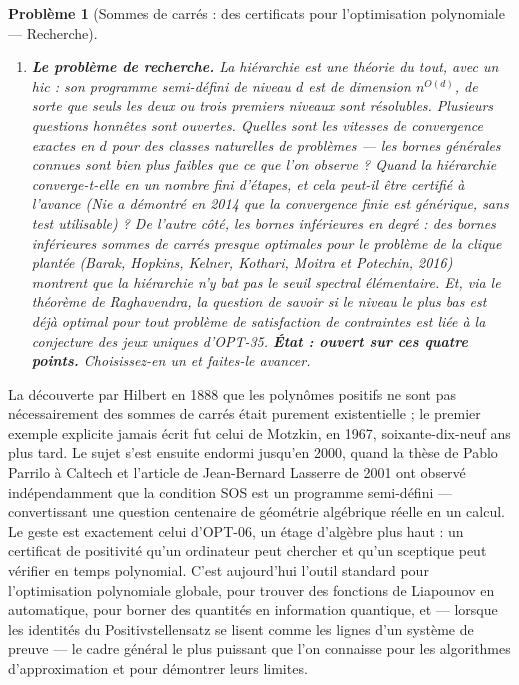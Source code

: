 \documentclass[11pt]{article}
\newtheorem{problem}{Problème}
\begin{document}
\begin{problem}[{Sommes de carrés : des certificats pour l'optimisation polynomiale --- Recherche}]
\begin{enumerate}
\item[(d)] \textbf{Le problème de recherche.} La hiérarchie est une théorie du tout, avec un hic : son programme semi-défini de niveau $d$ est de dimension $n^{O(d)}$, de sorte que seuls les deux ou trois premiers niveaux sont résolubles. Plusieurs questions honnêtes sont ouvertes. Quelles sont les vitesses de convergence exactes en $d$ pour des classes naturelles de problèmes --- les bornes générales connues sont bien plus faibles que ce que l'on observe ? Quand la hiérarchie converge-t-elle en un nombre fini d'étapes, et cela peut-il être certifié à l'avance (Nie a démontré en 2014 que la convergence finie est générique, sans test utilisable) ? De l'autre côté, les bornes inférieures en degré : des bornes inférieures sommes de carrés presque optimales pour le problème de la clique plantée (Barak, Hopkins, Kelner, Kothari, Moitra et Potechin, 2016) montrent que la hiérarchie n'y bat pas le seuil spectral élémentaire. Et, via le théorème de Raghavendra, la question de savoir si le niveau le plus bas est déjà optimal pour tout problème de satisfaction de contraintes est liée à la conjecture des jeux uniques d'OPT-35. \textbf{État : ouvert sur ces quatre points.} Choisissez-en un et faites-le avancer.
\end{enumerate}

\end{problem}

\noindent La découverte par Hilbert en 1888 que les polynômes positifs ne sont pas nécessairement des sommes de carrés était purement existentielle ; le premier exemple explicite jamais écrit fut celui de Motzkin, en 1967, soixante-dix-neuf ans plus tard. Le sujet s'est ensuite endormi jusqu'en 2000, quand la thèse de Pablo Parrilo à Caltech et l'article de Jean-Bernard Lasserre de 2001 ont observé indépendamment que la condition SOS est un programme semi-défini --- convertissant une question centenaire de géométrie algébrique réelle en un calcul. Le geste est exactement celui d'OPT-06, un étage d'algèbre plus haut : un certificat de positivité qu'un ordinateur peut chercher et qu'un sceptique peut vérifier en temps polynomial. C'est aujourd'hui l'outil standard pour l'optimisation polynomiale globale, pour trouver des fonctions de Liapounov en automatique, pour borner des quantités en information quantique, et --- lorsque les identités du Positivstellensatz se lisent comme les lignes d'un système de preuve --- le cadre général le plus puissant que l'on connaisse pour les algorithmes d'approximation et pour démontrer leurs limites.
\end{document}
